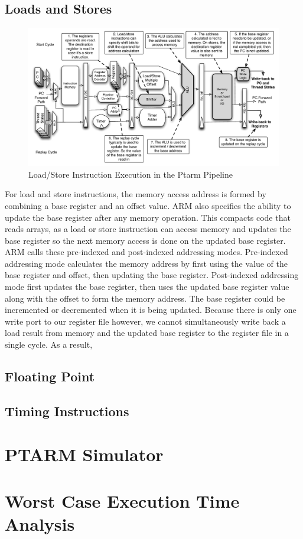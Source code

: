 \subsection{Loads and Stores}
\begin{figure}
  \vspace{-20pt}
  \begin{center}
    \includegraphics[scale=.6]{figs/ldstr_pipeline_implementation}
  \end{center}
  \vspace{-20pt}
  \caption{Load/Store Instruction Execution in the Ptarm Pipeline}
  \label{fig:ldstr_pipeline_implementation}
\end{figure}
For load and store instructions, the memory access address is formed by combining a base register and an offset value. 
ARM also specifies the ability to update the base register after any memory operation. 
This compacts code that reads arrays, as a load or store instruction can access memory and updates the base register so the next memory access is done on the updated base register.
ARM calls these pre-indexed and post-indexed addressing modes. 
Pre-indexed addressing mode calculates the memory address by first using the value of the base register and offset, then updating the base register. 
Post-indexed addressing mode first updates the base register, then uses the updated base register value along with the offset to form the memory address. 
The base register could be incremented or decremented when it is being updated.   
Because there is only one write port to our register file however, we cannot simultaneously write back a load result from memory and the updated base register to the register file in a single cycle. 
As a result, 
\subsection{Floating Point}

\subsection{Timing Instructions}

\section{PTARM Simulator}
\label{sec:ptarm_sim}

\section{Worst Case Execution Time Analysis}
\label{sec:wcet}




